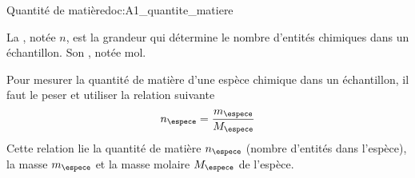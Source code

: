 \begin{doc}{Quantité de matière}{doc:A1_quantite_matiere}
  \begin{importants}
    La , notée $n$, est la grandeur qui détermine le nombre d'entités chimiques dans un échantillon.
    Son , notée \unit{\mole}.
  \end{importants}

  Pour mesurer la quantité de matière d'une espèce chimique dans un échantillon,
  il faut le peser et utiliser la relation suivante
  \begin{equation*}
    n_\espece = \dfrac{m_\espece}{M_\espece}
  \end{equation*}
  Cette relation lie la quantité de matière $n_\espece$ (nombre d'entités dans l'espèce), la masse $m_\espece$ et la masse molaire $M_\espece$ de l'espèce.
\end{doc}

